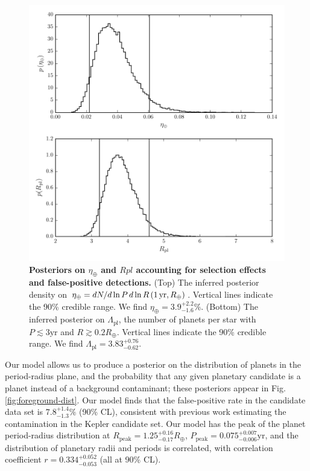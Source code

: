 \documentclass[12pt]{article}
\newcommand{\etaearth}{\eta_\oplus}
\newcommand{\Rpeak}{R_\mathrm{peak}}
\newcommand{\REarth}{R_\oplus}
\newcommand{\Rpl}{\Lambda_\mathrm{pl}}
\newcommand{\earange}{3.9_{-1.6}^{+2.2}\%}
\newcommand{\rplrange}{3.83_{-0.62}^{+0.76}}
\newcommand{\rpeakrange}{1.25_{-0.17}^{+0.16}}
\newcommand{\corrcoeffrange}{0.334_{-0.053}^{+0.052}}
\newcommand{\fposrange}{7.8_{-1.3}^{+1.4}\%}
\newcommand{\ppeakrange}{0.075_{-0.006}^{+0.007}}
\begin{document}
\begin{figure}
  \includegraphics[width=\columnwidth]{pars}
  \caption{\label{fig:eta-earth} \textbf{Posteriors on $\etaearth$ and
      $Rpl$ accounting for selection effects and false-positive
      detections.}  (Top) The inferred posterior density on $\etaearth
    = dN/d\ln P \, d\ln R \left( 1\, \textnormal{yr}, R_\oplus
    \right)$.  Vertical lines indicate the 90\% credible range.  We
    find $\etaearth = \earange$.  (Bottom) The inferred posterior on
    $\Rpl$, the number of planets per star with $P \lesssim 3
    \mathrm{yr}$ and $R \gtrsim 0.2 \REarth$.  Vertical lines indicate
    the 90\% credible range.  We find $\Rpl = \rplrange$.}
\end{figure}

Our model allows us to produce a posterior on the distribution of
planets in the period-radius plane, and the probability that any given
planetary candidate is a planet instead of a background contaminant;
these posteriors appear in Fig. \ref{fig:foreground-dist}.  Our model
finds that the false-positive rate in the candidate data set is
$\fposrange$ (90\% CL), consistent with previous
work\cite{Fressin2013} estimating the contamination in the Kepler
candidate set.  Our model has the peak of the planet period-radius
distribution at $\Rpeak = \rpeakrange \REarth$, $P_\mathrm{peak} =
\ppeakrange \mathrm{yr}$, and the distribution of planetary radii and
periods is correlated, with correlation coefficient $r =
\corrcoeffrange$ (all at 90\% CL).
\end{document}
